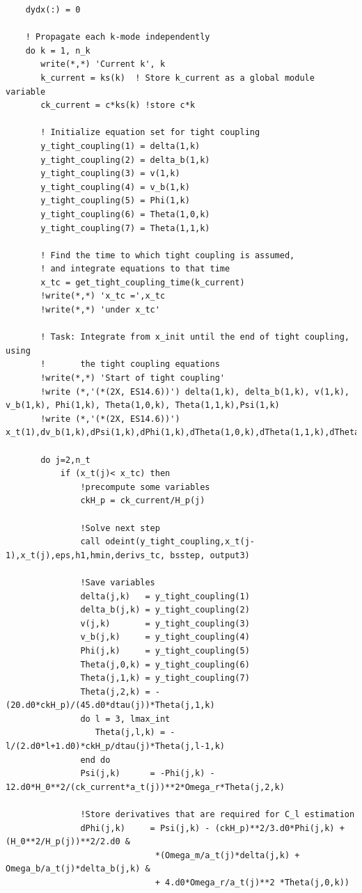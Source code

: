 \documentclass[a4paper]{report}
\begin{document}
\begin{verbatim}
    dydx(:) = 0

    ! Propagate each k-mode independently
    do k = 1, n_k
       write(*,*) 'Current k', k
       k_current = ks(k)  ! Store k_current as a global module variable
       ck_current = c*ks(k) !store c*k

       ! Initialize equation set for tight coupling
       y_tight_coupling(1) = delta(1,k)
       y_tight_coupling(2) = delta_b(1,k)
       y_tight_coupling(3) = v(1,k)
       y_tight_coupling(4) = v_b(1,k)
       y_tight_coupling(5) = Phi(1,k)
       y_tight_coupling(6) = Theta(1,0,k)
       y_tight_coupling(7) = Theta(1,1,k)
       
       ! Find the time to which tight coupling is assumed, 
       ! and integrate equations to that time
       x_tc = get_tight_coupling_time(k_current)
       !write(*,*) 'x_tc =',x_tc
       !write(*,*) 'under x_tc'

       ! Task: Integrate from x_init until the end of tight coupling, using
       !       the tight coupling equations
       !write(*,*) 'Start of tight coupling'
       !write (*,'(*(2X, ES14.6))') delta(1,k), delta_b(1,k), v(1,k), v_b(1,k), Phi(1,k), Theta(1,0,k), Theta(1,1,k),Psi(1,k)
       !write (*,'(*(2X, ES14.6))') x_t(1),dv_b(1,k),dPsi(1,k),dPhi(1,k),dTheta(1,0,k),dTheta(1,1,k),dTheta(1,2,k)

       do j=2,n_t
           if (x_t(j)< x_tc) then 
               !precompute some variables
               ckH_p = ck_current/H_p(j)

               !Solve next step
               call odeint(y_tight_coupling,x_t(j-1),x_t(j),eps,h1,hmin,derivs_tc, bsstep, output3)

               !Save variables
               delta(j,k)   = y_tight_coupling(1)
               delta_b(j,k) = y_tight_coupling(2)
               v(j,k)       = y_tight_coupling(3)
               v_b(j,k)     = y_tight_coupling(4)
               Phi(j,k)     = y_tight_coupling(5)
               Theta(j,0,k) = y_tight_coupling(6)
               Theta(j,1,k) = y_tight_coupling(7)
               Theta(j,2,k) = -(20.d0*ckH_p)/(45.d0*dtau(j))*Theta(j,1,k)
               do l = 3, lmax_int
                  Theta(j,l,k) = -l/(2.d0*l+1.d0)*ckH_p/dtau(j)*Theta(j,l-1,k)
               end do	
               Psi(j,k)      = -Phi(j,k) - 12.d0*H_0**2/(ck_current*a_t(j))**2*Omega_r*Theta(j,2,k)

               !Store derivatives that are required for C_l estimation
               dPhi(j,k)     = Psi(j,k) - (ckH_p)**2/3.d0*Phi(j,k) + (H_0**2/H_p(j))**2/2.d0 &
                              *(Omega_m/a_t(j)*delta(j,k) + Omega_b/a_t(j)*delta_b(j,k) &
                              + 4.d0*Omega_r/a_t(j)**2 *Theta(j,0,k))


\end{verbatim}
\end{document}
